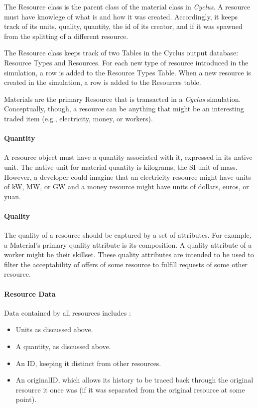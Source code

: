 \documentclass[letterpaper,10pt,english]{sphinxmanual}
\begin{document}
The Resource class is the parent class of the material class in \emph{Cyclus}. A
resource must have knowlege of what is and how it was created.  Accordingly, it
keeps track of its units, quality, quantity, the id of its creator, and if it
was spawned from the splitting of a different resource.

The Resource class keeps track of two Tables in the Cyclus output
database: Resource Types and Resources. For each new type of resource
introduced in the simulation, a row is added to the Resource Types
Table. When a new resource is created in the simulation, a row is
added to the Resources table.

Materials are the primary Resource that is transacted in a \emph{Cyclus} simulation.
Conceptually, though, a resource can be anything that might be an interesting
traded item (e.g., electricity, money, or workers).


\paragraph{Quantity}
\label{devdoc/resources:quantity}
A resource object must have a quantity associated with it, expressed in its
native unit. The native unit for material quantity is kilograms, the SI unit of
mass. However, a developer could imagine that an electricity resource might have
units of kW, MW, or GW and a money resource might have units of dollars, euros,
or yuan.


\paragraph{Quality}
\label{devdoc/resources:quality}
The quality of a resource should be captured by a set of attributes. For
example, a Material's primary quality attribute is its composition. A quality
attribute of a worker might be their skillset. These quality attributes are
intended to be used to filter the acceptability of offers of some resource to
fulfill requests of some other resource.


\paragraph{Resource Data}
\label{devdoc/resources:resource-data}
Data contained by all resources includes :
\begin{itemize}
\item {} 
Units as discussed above.

\item {} 
A quantity, as discussed above.

\item {} 
An ID, keeping it distinct from other resources.

\item {} 
An originalID, which allows its history to be traced back through the
original resource it once was (if it was separated from the original resource
at some point).

\end{itemize}
\end{document}
